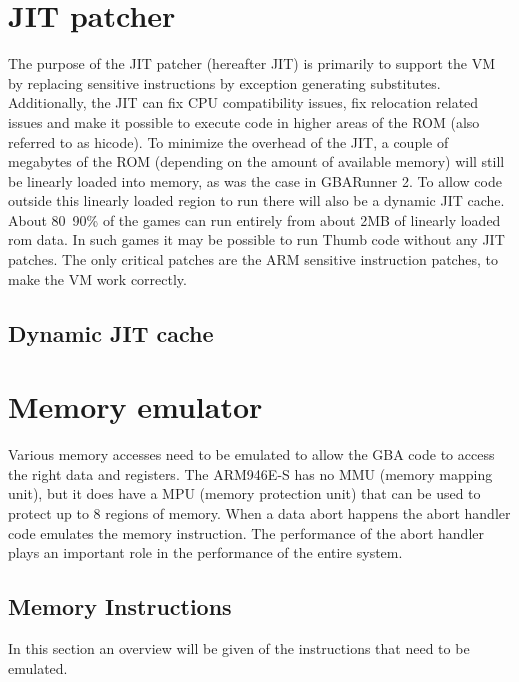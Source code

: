 \documentclass[a4paper,10pt]{report}
\begin{document}
\chapter{JIT patcher}\label{chap_jit}
	The purpose of the JIT patcher (hereafter JIT) is primarily to support the VM by replacing sensitive instructions by exception generating substitutes. Additionally, the JIT can fix CPU compatibility issues, fix relocation related issues and make it possible to execute code in higher areas of the ROM (also referred to as hicode). To minimize the overhead of the JIT, a couple of megabytes of the ROM (depending on the amount of available memory) will still be linearly loaded into memory, as was the case in GBARunner 2. To allow code outside this linearly loaded region to run there will also be a dynamic JIT cache. About 80~90\% of the games can run entirely from about 2MB of linearly loaded rom data. In such games it may be possible to run Thumb code without any JIT patches. The only critical patches are the ARM sensitive instruction patches, to make the VM work correctly.
	
	\section{Dynamic JIT cache}
	
\chapter{Memory emulator}\label{chap_mememu}
	Various memory accesses need to be emulated to allow the GBA code to access the right data and registers. The ARM946E-S has no MMU (memory mapping unit), but it does have a MPU (memory protection unit) that can be used to protect up to 8 regions of memory. When a data abort happens the abort handler code emulates the memory instruction. The performance of the abort handler plays an important role in the performance of the entire system.
	\section{Memory Instructions}
	In this section an overview will be given of the instructions that need to be emulated.
\end{document}
